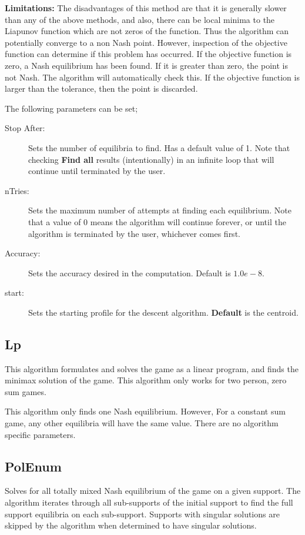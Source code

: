 {\bf Limitations:} The disadvantages of this method are that it is
generally slower than any of the above methods, and also, there can be
local minima to the Liapunov function which are not zeros of the
function.  Thus the algorithm can potentially converge to a non Nash
point.  However, inspection of the objective function can determine if
this problem has occurred.  If the objective function is zero, a Nash
equilibrium has been found. If it is greater than zero, the point is
not Nash.  The algorithm will automatically check this.  If the
objective function is larger than the tolerance, then the point is
discarded.

The following parameters can be set;

\begin{description}
\item[Stop After:] Sets the number of equilibria to find.  Has a
default value of 1. Note that checking {\bf Find all} results
(intentionally) in an infinite loop that will continue until
terminated by the user.
\item[nTries:] Sets the maximum number of attempts at finding each
equilibrium. Note that a value of 0 means the algorithm will continue
forever, or until the algorithm is terminated by the user, whichever
comes first.
\item[Accuracy:] Sets the accuracy desired in the computation.
Default is $1.0e-8.$ 
\item[start:] Sets the starting profile for the descent algorithm.
{\bf Default} is the centroid.
\end{description}

\subsection{Lp}\label{Lp}
This algorithm formulates and solves the game as a linear program, and
finds the minimax solution of the game.  This algorithm only works for
two person, zero sum games.

This algorithm only finds one Nash equilibrium.  However, For a
constant sum game, any other equilibria will have the same value.
There are no algorithm specific parameters.

\subsection{PolEnum}\label{PolEnum}
Solves for all totally mixed Nash equilibrium of the game on a given
support. The algorithm iterates through all sub-supports of the
initial support to find the full support equilibria on each
sub-support.  Supports with singular solutions are skipped by the
algorithm when determined to have singular solutions.

